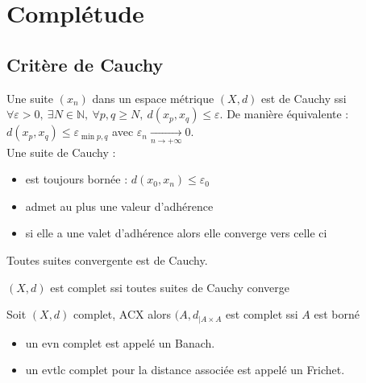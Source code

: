 \section{Complétude}
\subsection{Critère de Cauchy}
Une suite $(x_{n})$ dans un espace métrique $(X,d)$ est de Cauchy ssi $\forall \varepsilon >0,\ \exists N\in \mathbb{N} ,\ \forall p,q\ge N,\ d(x_p,x_q)\le \varepsilon $. De manière équivalente : $d(x_p,x_q)\le \varepsilon _{\min p,q}$ avec $\varepsilon _n \xrightarrow[n\to +\infty]{} 0$.\\

Une suite de Cauchy :
\begin{itemize}
    \item est toujours bornée : $d(x_0,x_n)\le \varepsilon _0$
    \item admet au plus une valeur d'adhérence
    \item si elle a une valet d'adhérence alors elle converge vers celle ci
\end{itemize}
Toutes suites convergente est de Cauchy.

\begin{definition}
    $(X,d)$ est complet ssi toutes suites de Cauchy converge
\end{definition}
\begin{lemme}
    Soit $(X,d)$ complet, ACX alors $(A,d_{|A\times A}$ est complet ssi $A$ est borné
\end{lemme}


\begin{remarque}
\begin{itemize}
    \item un evn complet est appelé un Banach.
    \item un evtlc complet pour la distance associée est appelé un Frichet.
\end{itemize}
\end{remarque}

